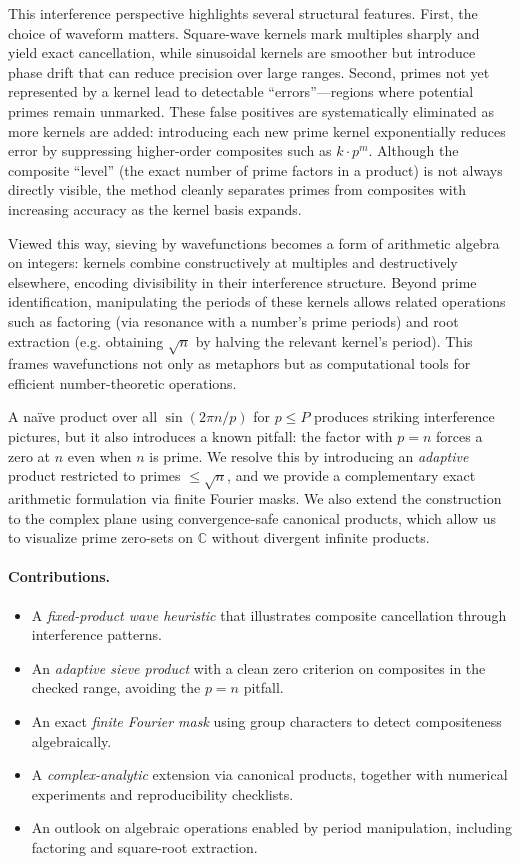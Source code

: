 \documentclass[12pt]{article}
\theoremstyle{definition}
\theoremstyle{remark}
\newcommand{\C}{\mathbb{C}}
\begin{document}
This interference perspective highlights several structural features. First, the choice of waveform matters. Square-wave kernels mark multiples sharply and yield exact cancellation, while sinusoidal kernels are smoother but introduce phase drift that can reduce precision over large ranges. Second, primes not yet represented by a kernel lead to detectable “errors”---regions where potential primes remain unmarked. These false positives are systematically eliminated as more kernels are added: introducing each new prime kernel exponentially reduces error by suppressing higher-order composites such as \(k\cdot p^m\). Although the composite “level” (the exact number of prime factors in a product) is not always directly visible, the method cleanly separates primes from composites with increasing accuracy as the kernel basis expands.

Viewed this way, sieving by wavefunctions becomes a form of arithmetic algebra on integers: kernels combine constructively at multiples and destructively elsewhere, encoding divisibility in their interference structure. Beyond prime identification, manipulating the periods of these kernels allows related operations such as factoring (via resonance with a number’s prime periods) and root extraction (e.g. obtaining \(\sqrt{n}\) by halving the relevant kernel’s period). This frames wavefunctions not only as metaphors but as computational tools for efficient number-theoretic operations.

A naïve product over all \(\sin(2\pi n/p)\) for \(p \le P\) produces striking interference pictures, but it also introduces a known pitfall: the factor with \(p=n\) forces a zero at \(n\) even when \(n\) is prime. We resolve this by introducing an \emph{adaptive} product restricted to primes \(\le \sqrt{n}\), and we provide a complementary exact arithmetic formulation via finite Fourier masks. We also extend the construction to the complex plane using convergence-safe canonical products, which allow us to visualize prime zero-sets on \(\C\) without divergent infinite products.

\paragraph{Contributions.}
\begin{itemize}
  \item A \emph{fixed-product wave heuristic} that illustrates composite cancellation through interference patterns.
  \item An \emph{adaptive sieve product} with a clean zero criterion on composites in the checked range, avoiding the \(p=n\) pitfall.
  \item An exact \emph{finite Fourier mask} using group characters to detect compositeness algebraically.
  \item A \emph{complex-analytic} extension via canonical products, together with numerical experiments and reproducibility checklists.
  \item An outlook on algebraic operations enabled by period manipulation, including factoring and square-root extraction.
\end{itemize}
\end{document}

